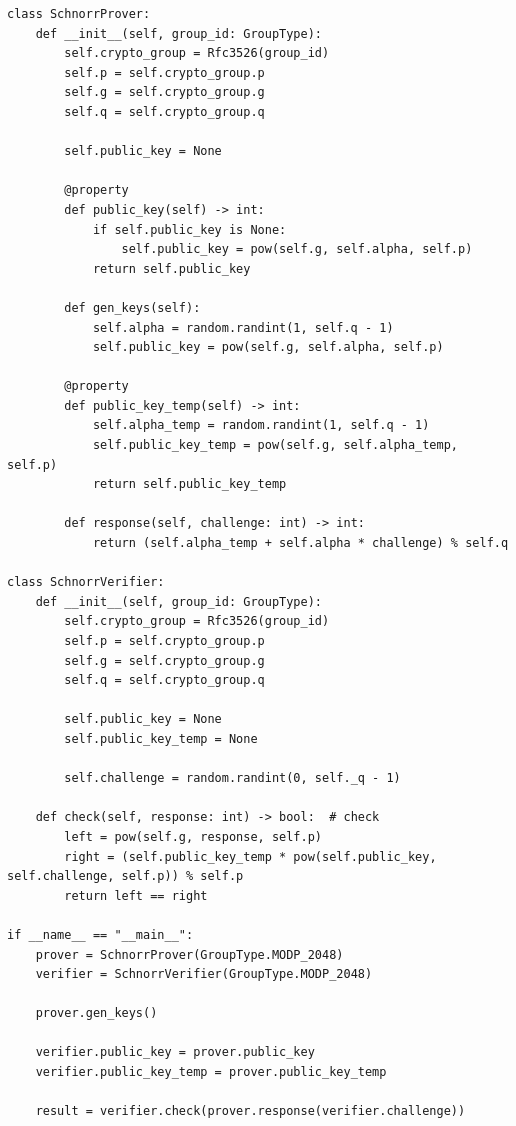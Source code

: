 \begin{listing}[!ht]
\begin{verbatim}
class SchnorrProver:
    def __init__(self, group_id: GroupType):
        self.crypto_group = Rfc3526(group_id)
        self.p = self.crypto_group.p
        self.g = self.crypto_group.g
        self.q = self.crypto_group.q

        self.public_key = None

        @property
        def public_key(self) -> int:
            if self.public_key is None:
                self.public_key = pow(self.g, self.alpha, self.p)
            return self.public_key
        
        def gen_keys(self):
            self.alpha = random.randint(1, self.q - 1)
            self.public_key = pow(self.g, self.alpha, self.p)

        @property
        def public_key_temp(self) -> int:
            self.alpha_temp = random.randint(1, self.q - 1)
            self.public_key_temp = pow(self.g, self.alpha_temp, self.p)
            return self.public_key_temp

        def response(self, challenge: int) -> int:
            return (self.alpha_temp + self.alpha * challenge) % self.q

class SchnorrVerifier:
    def __init__(self, group_id: GroupType):
        self.crypto_group = Rfc3526(group_id)
        self.p = self.crypto_group.p
        self.g = self.crypto_group.g
        self.q = self.crypto_group.q

        self.public_key = None
        self.public_key_temp = None

        self.challenge = random.randint(0, self._q - 1)

    def check(self, response: int) -> bool:  # check
        left = pow(self.g, response, self.p)
        right = (self.public_key_temp * pow(self.public_key, self.challenge, self.p)) % self.p
        return left == right

if __name__ == "__main__":
    prover = SchnorrProver(GroupType.MODP_2048)
    verifier = SchnorrVerifier(GroupType.MODP_2048)
    
    prover.gen_keys()
    
    verifier.public_key = prover.public_key
    verifier.public_key_temp = prover.public_key_temp

    result = verifier.check(prover.response(verifier.challenge))
\end{verbatim}
\caption{Classi SchnorrProver e SchnorrVerifier}
\end{listing}